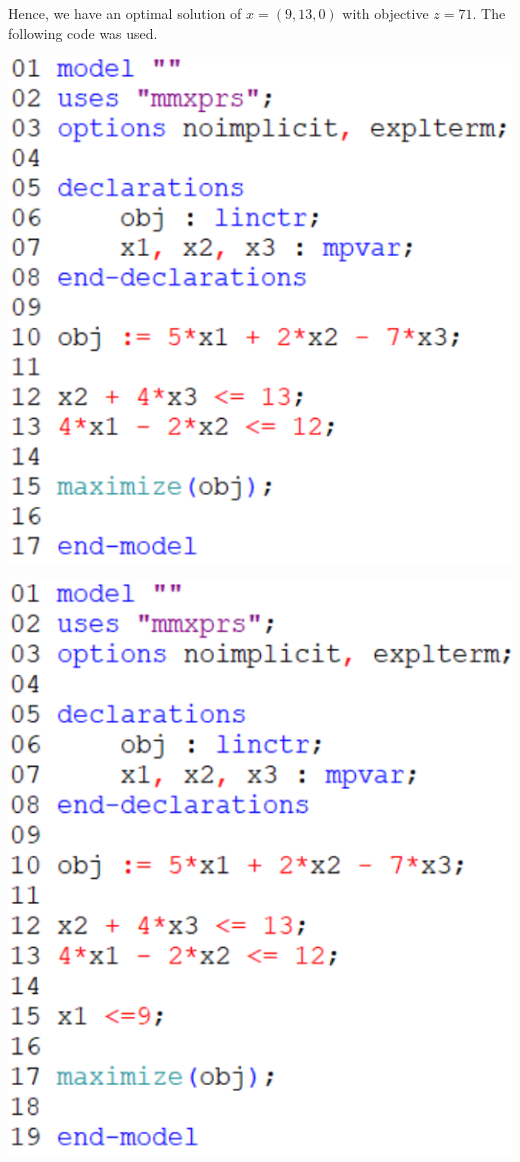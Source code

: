 \documentclass[12pt]{article}
\theoremstyle{definition}
\begin{document}
Hence, we have an optimal solution of $x = (9, 13, 0)$ with objective $z = 71$. The following code was used.
\begin{center}
    \begin{minipage}{0.3\textwidth}
        \includegraphics[width=\textwidth]{code1a.png}
    \end{minipage}
    \begin{minipage}{0.3\textwidth}
        \includegraphics[width=\textwidth]{code1b.png}

\end{minipage}
\end{center}
\end{document}
